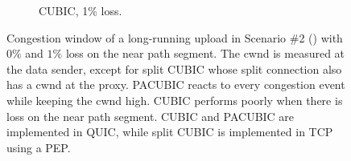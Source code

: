 \begin{figure}[t]
\begin{subfigure}{0.32\linewidth}
  \caption{CUBIC, 1\% loss.}
  \label{fig:sidekick:pacubic:cubic-loss1p}
\end{subfigure}
\caption{Congestion window of a long-running upload in Scenario \#2
() with $0\%$ and $1\%$ loss on the
near path segment. The cwnd is measured at the data sender,
except for split CUBIC whose split connection also has a cwnd at the proxy.
PACUBIC reacts to every congestion event while keeping the cwnd high.
CUBIC performs poorly when there is loss on the near path segment.
CUBIC and PACUBIC are implemented in QUIC, while split CUBIC is implemented
in TCP using a PEP.
}
\label{fig:sidekick:pacubic}
\end{figure}
